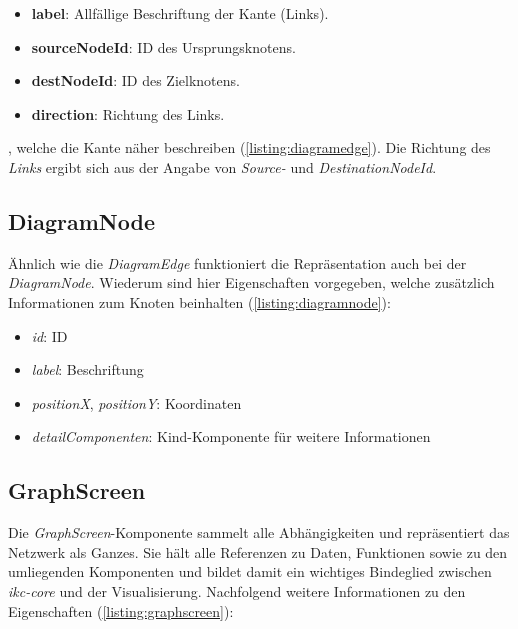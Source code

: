 \begin{itemize}
  \setlength\itemsep{1em}
    \item \textbf{label}: Allfällige Beschriftung der Kante (Links).
    \item \textbf{sourceNodeId}: ID des Ursprungsknotens.
    \item \textbf{destNodeId}: ID des Zielknotens.
    \item \textbf{direction}: Richtung des Links.
\end{itemize}

, welche die Kante näher beschreiben (\autoref{listing:diagramedge}). Die Richtung des \textit{Links} ergibt sich aus der Angabe von \textit{Source-} und \textit{DestinationNodeId}.


\subsection{DiagramNode}
Ähnlich wie die \textit{DiagramEdge} funktioniert die Repräsentation auch bei der \textit{DiagramNode}. Wiederum sind hier Eigenschaften vorgegeben, welche zusätzlich Informationen zum Knoten beinhalten (\autoref{listing:diagramnode}):

\begin{itemize}
    \item \textit{id}: ID
    \item \textit{label}: Beschriftung
    \item \textit{positionX}, \textit{positionY}: Koordinaten
    \item \textit{detailComponenten}: Kind-Komponente für weitere Informationen
\end{itemize}


\subsection{GraphScreen}\label{GraphScreen}
Die \textit{GraphScreen}-Komponente sammelt alle Abhängigkeiten und repräsentiert das Netzwerk als Ganzes. Sie hält alle Referenzen zu Daten, Funktionen sowie zu den umliegenden Komponenten und bildet damit ein wichtiges Bindeglied zwischen \textit{ikc-core} und der Visualisierung. Nachfolgend weitere Informationen zu den Eigenschaften (\autoref{listing:graphscreen}):

